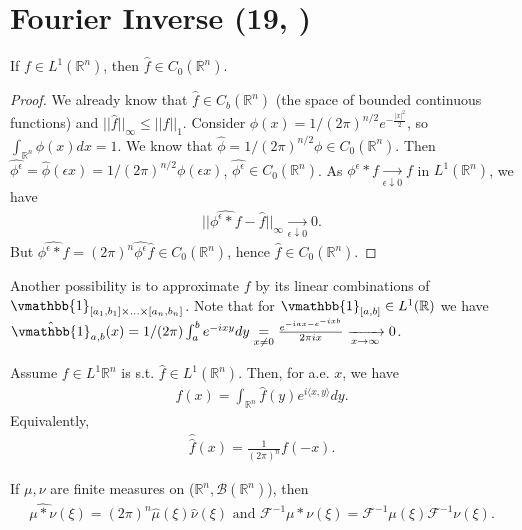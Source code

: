 \section{Fourier Inverse \tiny{(19, \cite{schilling2017measures})}}
\begin{corollary}
    If \(f\in L^1(\mathbb{R}^n)\), then \(\hat{f} \in C_0(\mathbb{R}^n)\).
\end{corollary}
\ifdetailed 
\begin{proof}
    We already know that \(\hat{f}\in C_b(\mathbb{R}^n)\) (the space of bounded continuous functions) and \(||\hat{f}||_{\infty} \leq ||f||_1\). Consider \( \phi(x)=1/(2\pi)^{n/2} e^{-\frac{|x|^2}{2}}\), so \(\int_{\mathbb{R}^n}\phi(x)dx = 1\). We know that \(\hat{\phi}= 1/(2\pi)^{n/2} \phi\in C_0(\mathbb{R}^n)\). Then \(\widehat{\phi^{\epsilon}} = \hat{\phi}(\epsilon x) = 1/(2\pi)^{n/2}\phi(\epsilon x)\), \(\hat{\phi^{\epsilon}} \in C_0(\mathbb{R}^n)\). As \(\phi^{\epsilon}\ast f\xrightarrow[\epsilon\downarrow 0]{ }f\) in \(L^1(\mathbb{R}^n)\), we have 
    \begin{align*}
        ||\widehat{\phi^{\epsilon}\ast f} - \hat{f}||_{\infty} \xrightarrow[\epsilon\downarrow 0]{ } 0.
    \end{align*}
    But \(\widehat{\phi^{\epsilon}\ast f} = (2\pi)^n \widehat{\phi^{\epsilon}}\hat{f}\in C_0(\mathbb{R}^n)\), hence \(\hat{f}\in C_0(\mathbb{R}^n)\).
\end{proof}
\fi 
\begin{remark}
    Another possibility is to approximate \(f\) by its linear combinations of \(\vmathbb{1}_{[a_1, b_1] \times ...\times [a_n, b_n]}\). Note that for \(\vmathbb{1}_{[a,b]}\in L^1(\mathbb{R})\) we have \(\hat{\vmathbb{1}}_{a,b}(x) = 1/(2\pi) \int_{a}^{b}e^{-ixy}dy \underset{x\neq 0}{=} \frac{e^{-iax - e^{-ixb}}}{2\pi ix}\xrightarrow[x\rightarrow \infty]{ }0\).
\end{remark}
\begin{theorem}
    Assume \(f\in L^1{\mathbb{R}^n}\) is s.t. \(\hat{f}\in L^1(\mathbb{R}^n)\). Then, for a.e. \(x\), we have
    \begin{align*}
        f(x) = \int_{\mathbb{R}^n}\hat{f}(y)e^{i\langle x,y\rangle} dy.
    \end{align*}
    Equivalently, 
    \begin{align*}
        \hat{\hat{f}}(x) = \frac{1}{(2\pi)^n}f(-x).
    \end{align*}
\end{theorem}
\begin{theorem}
    If \(\mu,\nu\) are finite measures on (\(\mathbb{R}^n, \mathscr{B}(\mathbb{R}^n)\)), then
    \begin{align*}
        \widehat{\mu\ast \nu}(\xi) = (2\pi)^n \hat{\mu}(\xi)\hat{\nu}(\xi) \text{ and } \mathcal{F}^{-1} \mu\ast\nu(\xi) = \mathcal{F}^{-1}\mu(\xi)\mathcal{F}^{-1}\nu(\xi).
    \end{align*}
\end{theorem}
